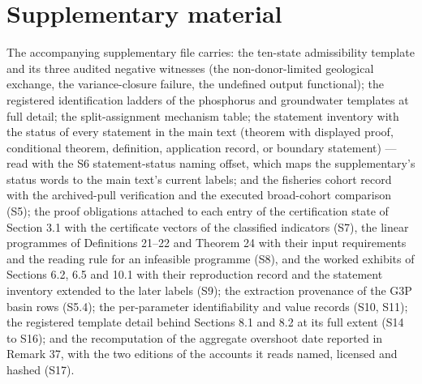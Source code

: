 \documentclass[11pt]{article}
\begin{document}
\vspace{0.8em}

\section*{Supplementary material}\label{supplementary-material}

The accompanying supplementary file carries: the ten-state admissibility template and its three audited negative witnesses (the non-donor-limited geological exchange, the variance-closure failure, the undefined output functional); the registered identification ladders of the phosphorus and groundwater templates at full detail; the split-assignment mechanism table; the statement inventory with the status of every statement in the main text (theorem with displayed proof, conditional theorem, definition, application record, or boundary statement) --- read with the S6 statement-status naming offset, which maps the supplementary's status words to the main text's current labels; and the fisheries cohort record with the archived-pull verification and the executed broad-cohort comparison (S5); the proof obligations attached to each entry of the certification state of Section 3.1 with the certificate vectors of the classified indicators (S7), the linear programmes of Definitions 21--22 and Theorem 24 with their input requirements and the reading rule for an infeasible programme (S8), and the worked exhibits of Sections 6.2, 6.5 and 10.1 with their reproduction record and the statement inventory extended to the later labels (S9); the extraction provenance of the G3P basin rows (S5.4); the per-parameter identifiability and value records (S10, S11); the registered template detail behind Sections 8.1 and 8.2 at its full extent (S14 to S16); and the recomputation of the aggregate overshoot date reported in Remark 37, with the two editions of the accounts it reads named, licensed and hashed (S17).
\end{document}
